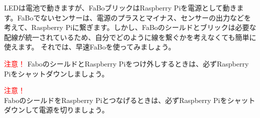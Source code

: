 LEDは電池で動きますが、FaBoブリックはRaspberry Piを電源として動きます。FaBoでないセンサーは、電源のプラスとマイナス、センサーの出力などを考えて、Raspberry Piに繋ぎます。しかし、FaBoのシールドとブリックは必要な配線が統一されているため、自分でどのように線を繋ぐかを考えなくても簡単に使えます。
それでは、早速FaBoを使ってみましょう。

\begin{itembox}[c]{\Large\textcolor{red}{注意！}}
FaboのシールドとRaspberry Piをつけ外しするときは、必ずRaspberry Piをシャットダウンしましょう。
\end{itembox}

{\Large\textcolor{red}{注意！}}\\
FaboのシールドをRaspberry Piとつなげるときは、必ずRaspberry Piをシャットダウンして電源を切りましょう。\\
\\
